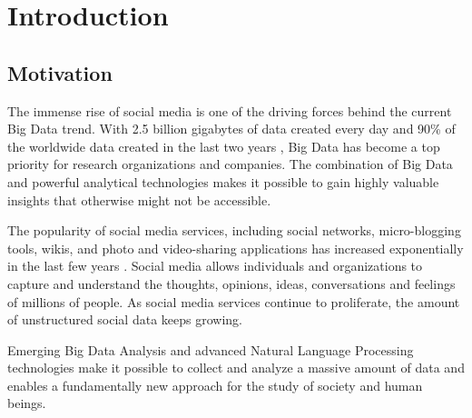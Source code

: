 
\chapter{Introduction}
\label{cha:introduction}

\section{Motivation}
\label{sec:motivation}
The immense rise of social media is one of the driving forces behind the current Big Data trend. With 2.5 billion gigabytes of data created every day and 90\% of the worldwide data created in the last two years \cite{ibm2012bigdata}, Big Data has become a top priority for research organizations and companies. The combination of Big Data and powerful analytical technologies makes it possible to gain highly valuable insights that otherwise might not be accessible.

The popularity of social media services, including social networks, micro-blogging tools, wikis, and photo and video-sharing applications has increased exponentially in the last few years \cite{cambria2013big}. Social media allows individuals and organizations to capture and understand the thoughts, opinions, ideas, conversations and feelings of millions of people. As social media services continue to proliferate, the amount of unstructured social data keeps growing.

Emerging Big Data Analysis and advanced Natural Language Processing technologies make it possible to collect and analyze a massive amount of data and enables a fundamentally new approach for the study of society and human beings.

